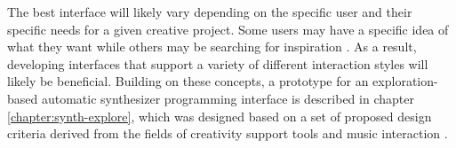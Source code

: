 The best interface will likely vary depending on the specific user and their specific needs for a given creative project. Some users may have a specific idea of what they want while others may be searching for inspiration \cite{andersen2016conversations}. As a result, developing interfaces that support a variety of different interaction styles will likely be beneficial. Building on these concepts, a prototype for an exploration-based automatic synthesizer programming interface is described in chapter \ref{chapter:synth-explore}, which was designed based on a set of proposed design criteria derived from the fields of creativity support tools \cite{shneiderman2007creativity} and music interaction \cite{holland2013music}.









